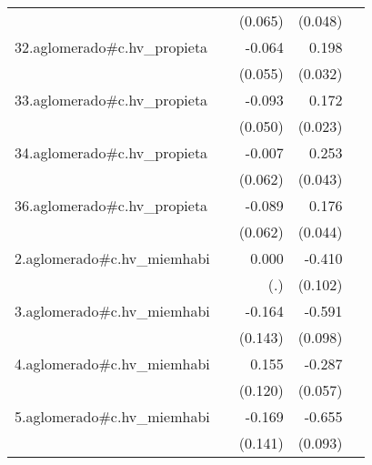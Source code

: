 {\begin{longtable}{l*{4}{D{.}{.}{-1}}}
            &                     &     (0.065)         &     (0.048)         &                     \\
\addlinespace
32.aglomerado#c.hv\_propieta&                     &      -0.064         &       0.198\sym{***}&                     \\
            &                     &     (0.055)         &     (0.032)         &                     \\
\addlinespace
33.aglomerado#c.hv\_propieta&                     &      -0.093         &       0.172\sym{***}&                     \\
            &                     &     (0.050)         &     (0.023)         &                     \\
\addlinespace
34.aglomerado#c.hv\_propieta&                     &      -0.007         &       0.253\sym{***}&                     \\
            &                     &     (0.062)         &     (0.043)         &                     \\
\addlinespace
36.aglomerado#c.hv\_propieta&                     &      -0.089         &       0.176\sym{***}&                     \\
            &                     &     (0.062)         &     (0.044)         &                     \\
\addlinespace
2.aglomerado#c.hv\_miemhabi&                     &       0.000         &      -0.410\sym{***}&                     \\
            &                     &         (.)         &     (0.102)         &                     \\
\addlinespace
3.aglomerado#c.hv\_miemhabi&                     &      -0.164         &      -0.591\sym{***}&                     \\
            &                     &     (0.143)         &     (0.098)         &                     \\
\addlinespace
4.aglomerado#c.hv\_miemhabi&                     &       0.155         &      -0.287\sym{***}&                     \\
            &                     &     (0.120)         &     (0.057)         &                     \\
\addlinespace
5.aglomerado#c.hv\_miemhabi&                     &      -0.169         &      -0.655\sym{***}&                     \\
            &                     &     (0.141)         &     (0.093)         &                     \\

\end{longtable}}
